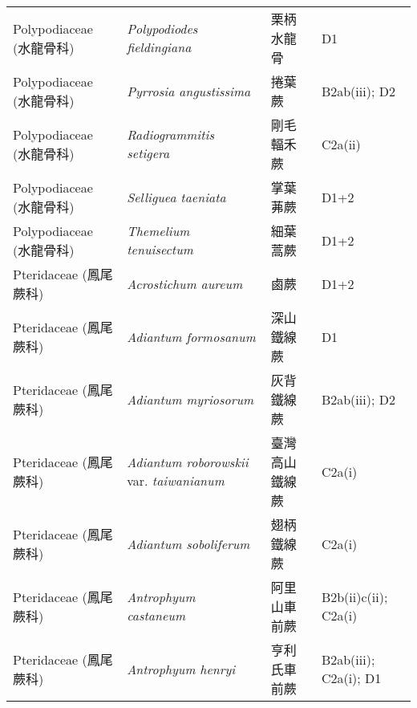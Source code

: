 \begin{longtable}{p{3cm}p{5cm}p{3cm}p{4cm}}
    Polypodiaceae (水龍骨科) & \textit{Polypodiodes fieldingiana}  & 栗柄水龍骨 & D1 \index{Polypodiodes@\textit{Polypodiodes}!fieldingiana@\textit{fieldingiana}}  \index{栗柄水龍骨} \\
    Polypodiaceae (水龍骨科) & \textit{Pyrrosia angustissima}  & 捲葉蕨 & B2ab(iii); D2 \index{Pyrrosia@\textit{Pyrrosia}!angustissima@\textit{angustissima}}  \index{捲葉蕨} \\
    Polypodiaceae (水龍骨科) & \textit{Radiogrammitis setigera}  & 剛毛輻禾蕨 & C2a(ii) \index{Radiogrammitis@\textit{Radiogrammitis}!setigera@\textit{setigera}}  \index{剛毛輻禾蕨} \\
    Polypodiaceae (水龍骨科) & \textit{Selliguea taeniata}  & 掌葉茀蕨 & D1+2 \index{Selliguea@\textit{Selliguea}!taeniata@\textit{taeniata}}  \index{掌葉茀蕨} \\
    Polypodiaceae (水龍骨科) & \textit{Themelium tenuisectum}  & 細葉蒿蕨 & D1+2 \index{Themelium@\textit{Themelium}!tenuisectum@\textit{tenuisectum}}  \index{細葉蒿蕨} \\
    Pteridaceae (鳳尾蕨科) & \textit{Acrostichum aureum}  & 鹵蕨 & D1+2 \index{Acrostichum@\textit{Acrostichum}!aureum@\textit{aureum}}  \index{鹵蕨} \\
    Pteridaceae (鳳尾蕨科) & \textit{Adiantum formosanum}  & 深山鐵線蕨 & D1 \index{Adiantum@\textit{Adiantum}!formosanum@\textit{formosanum}}  \index{深山鐵線蕨} \\
    Pteridaceae (鳳尾蕨科) & \textit{Adiantum myriosorum}  & 灰背鐵線蕨 & B2ab(iii); D2 \index{Adiantum@\textit{Adiantum}!myriosorum@\textit{myriosorum}}  \index{灰背鐵線蕨} \\
    Pteridaceae (鳳尾蕨科) & \textit{Adiantum roborowskii} var. \textit{taiwanianum}  & 臺灣高山鐵線蕨 & C2a(i) \index{Adiantum@\textit{Adiantum}!roborowskii@\textit{roborowskii}!var. taiwanianum@var. \textit{taiwanianum}}  \index{臺灣高山鐵線蕨} \\
    Pteridaceae (鳳尾蕨科) & \textit{Adiantum soboliferum}  & 翅柄鐵線蕨 & C2a(i) \index{Adiantum@\textit{Adiantum}!soboliferum@\textit{soboliferum}}  \index{翅柄鐵線蕨} \\
    Pteridaceae (鳳尾蕨科) & \textit{Antrophyum castaneum}  & 阿里山車前蕨 & B2b(ii)c(ii); C2a(i) \index{Antrophyum@\textit{Antrophyum}!castaneum@\textit{castaneum}}  \index{阿里山車前蕨} \\
    Pteridaceae (鳳尾蕨科) & \textit{Antrophyum henryi}  & 亨利氏車前蕨 & B2ab(iii); C2a(i); D1 \index{Antrophyum@\textit{Antrophyum}!henryi@\textit{henryi}}  \index{亨利氏車前蕨} \\

\end{longtable}
